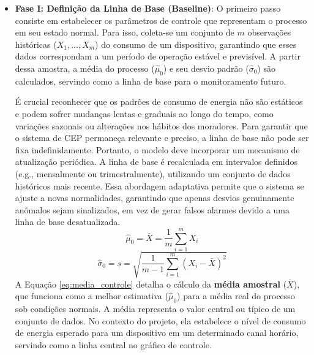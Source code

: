 \begin{itemize}
    \item \textbf{Fase I: Definição da Linha de Base (Baseline)}: O primeiro passo consiste em estabelecer os parâmetros de controle que representam o processo em seu estado normal. Para isso, coleta-se um conjunto de $m$ observações históricas ($X_1, \ldots, X_m$) do consumo de um dispositivo, garantindo que esses dados correspondam a um período de operação estável e previsível. A partir dessa amostra, a média do processo ($\hat{\mu}_0$) e seu desvio padrão ($\hat{\sigma}_0$) são calculados, servindo como a linha de base para o monitoramento futuro.

    É crucial reconhecer que os padrões de consumo de energia não são estáticos e podem sofrer mudanças lentas e graduais ao longo do tempo, como variações sazonais ou alterações nos hábitos dos moradores. Para garantir que o sistema de CEP permaneça relevante e preciso, a linha de base não pode ser fixa indefinidamente. Portanto, o modelo deve incorporar um mecanismo de atualização periódica. A linha de base é recalculada em intervalos definidos (e.g., mensalmente ou trimestralmente), utilizando um conjunto de dados históricos mais recente. Essa abordagem adaptativa permite que o sistema se ajuste a novas normalidades, garantindo que apenas desvios genuinamente anômalos sejam sinalizados, em vez de gerar falsos alarmes devido a uma linha de base desatualizada.
    \begin{equation}
        \hat{\mu}_0 = \bar{X} = \frac{1}{m}\sum_{i=1}^{m} X_i
        \label{eq:media_controle}
    \end{equation}
    \begin{equation}
        \hat{\sigma}_0 = s = \sqrt{\frac{1}{m-1}\sum_{i=1}^{m} (X_i - \bar{X})^2}
        \label{eq:desvio_padrao_controle}
    \end{equation}
    A Equação \ref{eq:media_controle} detalha o cálculo da \textbf{média amostral} ($\bar{X}$), que funciona como a melhor estimativa ($\hat{\mu}_0$) para a média real do processo sob condições normais. A média representa o valor central ou típico de um conjunto de dados. No contexto do projeto, ela estabelece o nível de consumo de energia esperado para um dispositivo em um determinado canal horário, servindo como a linha central no gráfico de controle.


\end{itemize}

